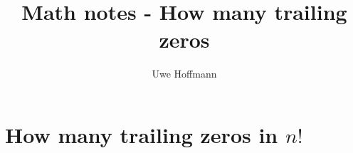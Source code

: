 

\title{Math notes - How many trailing zeros}
\author{Uwe Hoffmann}



\setcounter{chapter}{0}
\chapter{How many trailing zeros in $n!$}
